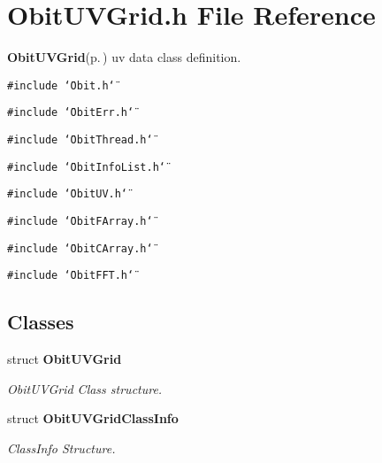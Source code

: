 \section{Obit\-UVGrid.h File Reference}
\label{ObitUVGrid_8h}
{\bf Obit\-UVGrid}{\rm (p.\,\pageref{structObitUVGrid})} uv data class definition. 

{\tt \#include \char`\"{}Obit.h\char`\"{}}\par
{\tt \#include \char`\"{}Obit\-Err.h\char`\"{}}\par
{\tt \#include \char`\"{}Obit\-Thread.h\char`\"{}}\par
{\tt \#include \char`\"{}Obit\-Info\-List.h\char`\"{}}\par
{\tt \#include \char`\"{}Obit\-UV.h\char`\"{}}\par
{\tt \#include \char`\"{}Obit\-FArray.h\char`\"{}}\par
{\tt \#include \char`\"{}Obit\-CArray.h\char`\"{}}\par
{\tt \#include \char`\"{}Obit\-FFT.h\char`\"{}}\par
\subsection*{Classes}
\begin{CompactItemize}
\item 
struct {\bf Obit\-UVGrid}
\begin{CompactList}\small\item\em Obit\-UVGrid Class structure. \item\end{CompactList}\item 
struct {\bf Obit\-UVGrid\-Class\-Info}
\begin{CompactList}\small\item\em Class\-Info Structure. \item\end{CompactList}\end{CompactItemize}
